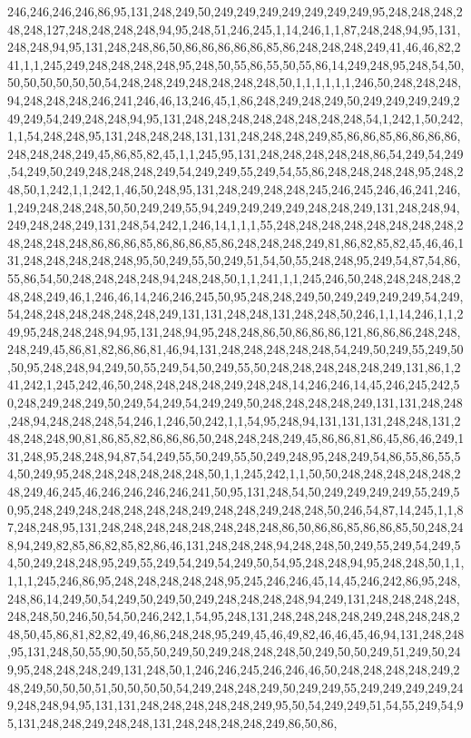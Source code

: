 246,246,246,246,86,95,131,248,249,50,249,249,249,249,249,249,249,95,248,248,248,248,248,127,248,248,248,248,94,95,248,51,246,245,1,14,246,1,1,87,248,248,94,95,131,248,248,94,95,131,248,248,86,50,86,86,86,86,86,85,86,248,248,248,249,41,46,46,82,241,1,1,245,249,248,248,248,248,95,248,50,55,86,55,50,55,86,14,249,248,95,248,54,50,50,50,50,50,50,50,54,248,248,249,248,248,248,248,50,1,1,1,1,1,1,246,50,248,248,248,94,248,248,248,246,241,246,46,13,246,45,1,86,248,249,248,249,50,249,249,249,249,249,249,54,249,248,248,94,95,131,248,248,248,248,248,248,248,248,54,1,242,1,50,242,1,1,54,248,248,95,131,248,248,248,131,131,248,248,248,249,85,86,86,85,86,86,86,86,248,248,248,249,45,86,85,82,45,1,1,245,95,131,248,248,248,248,248,86,54,249,54,249,54,249,50,249,248,248,248,249,54,249,249,55,249,54,55,86,248,248,248,248,95,248,248,50,1,242,1,1,242,1,46,50,248,95,131,248,249,248,248,245,246,245,246,46,241,246,1,249,248,248,248,50,50,249,249,55,94,249,249,249,249,248,248,249,131,248,248,94,249,248,248,249,131,248,54,242,1,246,14,1,1,1,55,248,248,248,248,248,248,248,248,248,248,248,248,86,86,86,85,86,86,86,85,86,248,248,248,249,81,86,82,85,82,45,46,46,131,248,248,248,248,248,95,50,249,55,50,249,51,54,50,55,248,248,95,249,54,87,54,86,55,86,54,50,248,248,248,248,94,248,248,50,1,1,241,1,1,245,246,50,248,248,248,248,248,248,249,46,1,246,46,14,246,246,245,50,95,248,248,249,50,249,249,249,249,54,249,54,248,248,248,248,248,248,249,131,131,248,248,131,248,248,50,246,1,1,14,246,1,1,249,95,248,248,248,94,95,131,248,94,95,248,248,86,50,86,86,86,121,86,86,86,248,248,248,249,45,86,81,82,86,86,81,46,94,131,248,248,248,248,248,54,249,50,249,55,249,50,50,95,248,248,94,249,50,55,249,54,50,249,55,50,248,248,248,248,248,249,131,86,1,241,242,1,245,242,46,50,248,248,248,248,249,248,248,14,246,246,14,45,246,245,242,50,248,249,248,249,50,249,54,249,54,249,249,50,248,248,248,248,249,131,131,248,248,248,94,248,248,248,54,246,1,246,50,242,1,1,54,95,248,94,131,131,131,248,248,131,248,248,248,90,81,86,85,82,86,86,86,50,248,248,248,249,45,86,86,81,86,45,86,46,249,131,248,95,248,248,94,87,54,249,55,50,249,55,50,249,248,95,248,249,54,86,55,86,55,54,50,249,95,248,248,248,248,248,248,50,1,1,245,242,1,1,50,50,248,248,248,248,248,248,249,46,245,46,246,246,246,246,241,50,95,131,248,54,50,249,249,249,249,55,249,50,95,248,249,248,248,248,248,248,249,248,248,249,248,248,50,246,54,87,14,245,1,1,87,248,248,95,131,248,248,248,248,248,248,248,248,86,50,86,86,85,86,86,85,50,248,248,94,249,82,85,86,82,85,82,86,46,131,248,248,248,94,248,248,50,249,55,249,54,249,54,50,249,248,248,95,249,55,249,54,249,54,249,50,54,95,248,248,94,95,248,248,50,1,1,1,1,1,245,246,86,95,248,248,248,248,248,95,245,246,246,45,14,45,246,242,86,95,248,248,86,14,249,50,54,249,50,249,50,249,248,248,248,248,94,249,131,248,248,248,248,248,248,50,246,50,54,50,246,242,1,54,95,248,131,248,248,248,248,249,248,248,248,248,50,45,86,81,82,82,49,46,86,248,248,95,249,45,46,49,82,46,46,45,46,94,131,248,248,95,131,248,50,55,90,50,55,50,249,50,249,248,248,248,50,249,50,50,249,51,249,50,249,95,248,248,248,249,131,248,50,1,246,246,245,246,246,46,50,248,248,248,248,249,248,249,50,50,50,51,50,50,50,50,54,249,248,248,249,50,249,249,55,249,249,249,249,249,248,248,94,95,131,131,248,248,248,248,248,249,95,50,54,249,249,51,54,55,249,54,95,131,248,248,249,248,248,131,248,248,248,248,249,86,50,86,